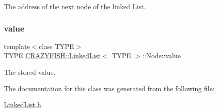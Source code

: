 The address of the next node of the linked List. \mbox{\label{classCRAZYFISH_1_1LinkedList_1_1Node_afe4cb216b2b093d60e522a69bfc575db}} 
\subsubsection{\texorpdfstring{value}{value}}
{\footnotesize\ttfamily template$<$class T\+Y\+PE$>$ \\
T\+Y\+PE \hyperlink{classCRAZYFISH_1_1LinkedList}{C\+R\+A\+Z\+Y\+F\+I\+S\+H\+::\+Linked\+List}$<$ T\+Y\+PE $>$\+::Node\+::value}

The stored value. 

The documentation for this class was generated from the following file\+:\begin{DoxyCompactItemize}
\item 
\hyperlink{LinkedList_8h}{Linked\+List.\+h}\end{DoxyCompactItemize}
